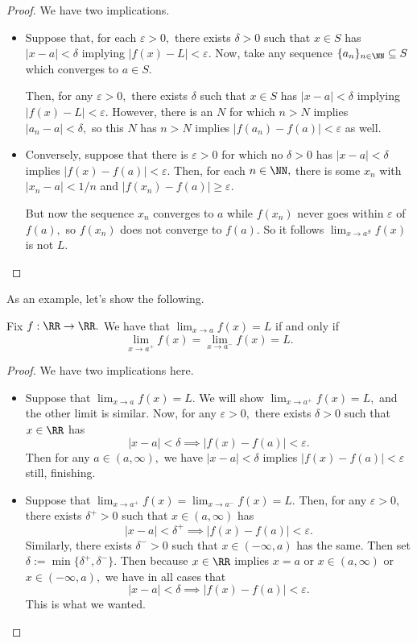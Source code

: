 \begin{proof}
	We have two implications.
	\begin{itemize}
		\item Suppose that, for each $\varepsilon>0,$ there exists $\delta>0$ such that $x\in S$ has $|x-a|<\delta$ implying $|f(x)-L|<\varepsilon.$ Now, take any sequence $\{a_n\}_{n\in\NN}\subseteq S$ which converges to $a\in S.$

		Then, for any $\varepsilon>0,$ there exists $\delta$ such that $x\in S$ has $|x-a|<\delta$ implying $|f(x)-L|<\varepsilon.$ However, there is an $N$ for which $n>N$ implies $|a_n-a|<\delta,$ so this $N$ has $n>N$ implies $|f(a_n)-f(a)|<\varepsilon$ as well.

		\item Conversely, suppose that there is $\varepsilon>0$ for which no $\delta>0$ has $|x-a|<\delta$ implies $|f(x)-f(a)|<\varepsilon.$ Then, for each $n\in\NN,$ there is some $x_n$ with $|x_n-a|<1/n$ and $|f(x_n)-f(a)|\ge\varepsilon.$

		But now the sequence $x_n$ converges to $a$ while $f(x_n)$ never goes within $\varepsilon$ of $f(a),$ so $f(x_n)$ does not converge to $f(a).$ So it follows $\lim_{x\to a^S}f(x)$ is not $L.$
		\qedhere
	\end{itemize}
\end{proof}
As an example, let's show the following.
\begin{proposition}
	Fix $f:\RR\to\RR.$ We have that $\lim_{x\to a}f(x)=L$ if and only if
	\[\lim_{x\to a^+}f(x)=\lim_{x\to a^-}f(x)=L.\]
\end{proposition}
\begin{proof}
	We have two implications here.
	\begin{itemize}
		\item Suppose that $\lim_{x\to a}f(x)=L.$ We will show $\lim_{x\to a^+}f(x)=L,$ and the other limit is similar. Now, for any $\varepsilon>0,$ there exists $\delta>0$ such that $x\in\RR$ has
		\[|x-a|<\delta\implies|f(x)-f(a)|<\varepsilon.\] 
		Then for any $a\in(a,\infty),$ we have $|x-a|<\delta$ implies $|f(x)-f(a)|<\varepsilon$ still, finishing.
		\item Suppose that $\lim_{x\to a^+}f(x)=\lim_{x\to a^-}f(x)=L.$ Then, for any $\varepsilon>0,$ there exists $\delta^+>0$ such that $x\in(a,\infty)$ has
		\[|x-a|<\delta^+\implies|f(x)-f(a)|<\varepsilon.\]
		Similarly, there exists $\delta^->0$ such that $x\in(-\infty,a)$ has the same. Then set $\delta:=\min\{\delta^+,\delta^-\}.$ Then because $x\in\RR$ implies $x=a$ or $x\in(a,\infty)$ or $x\in(-\infty,a),$ we have in all cases that
		\[|x-a|<\delta\implies|f(x)-f(a)|<\varepsilon.\]
		This is what we wanted.
		\qedhere
	\end{itemize}
\end{proof}
